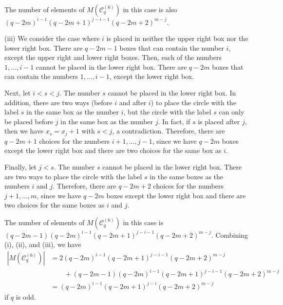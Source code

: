 \documentclass{article}
\theoremstyle{plain}
\theoremstyle{definition}
\theoremstyle{remark}
\numberwithin{equation}{section}
\newcommand{\Cc}{\mathcal{C}}
\begin{document}
The number of elements of $M(\Cc^{(6)}_q)$ in this case is also $(q-2m)^{i-1}(q-2m+1)^{j-i-1}(q-2m+2)^{m-j}$.

(i\hspace{-0.5mm}i\hspace{-0.5mm}i) We consider the case where $i$ is placed in neither the upper right box nor the lower right box. 
There are $q-2m-1$ boxes that can contain the number $i$, except the upper right and lower right boxes.
Then, each of the numbers $1,\dots,i-1$ cannot be placed in the lower right box.
There are $q-2m$ boxes that can contain the numbers $1,\dots,i-1$, except the lower right box.

Next, let $i<s<j$.
The number $s$ cannot be placed in the lower right box.
In addition, there are two ways (before $i$ and after $i$) to place the circle with the label $s$ in the same box as the number $i$, but the circle with the label $s$ can only be placed before $j$ in the same box as the number $j$.
In fact, if $s$ is placed after $j$, then we have $x_s=x_j+1$ with $s<j$, a contradiction.
Therefore, there are $q-2m+1$ choices for the numbers $i+1,\dots,j-1$, since we have $q-2m$ boxes except the lower right box and there are two choices for the same box as $i$.

Finally, let $j<s$.
The number $s$ cannot be placed in the lower right box.
There are two ways to place the circle with the label $s$ in the same boxes as the numbers $i$ and $j$.
Therefore, there are $q-2m+2$ choices for the numbers $j+1,\dots,m$, since we have $q-2m$ boxes except the lower right box and there are two choices for the same boxes as $i$ and $j$.

The number of elements of $M(\Cc^{(6)}_q)$ in this case is $(q-2m-1)(q-2m)^{i-1}(q-2m+1)^{j-i-1}(q-2m+2)^{m-j}$.
Combining (i), (i\hspace{-0.5mm}i), and (i\hspace{-0.5mm}i\hspace{-0.5mm}i), we have 
\begin{align*}
|M(\Cc^{(6)}_q)|
&=2(q-2m)^{i-1}(q-2m+1)^{j-i-1}(q-2m+2)^{m-j}\\
&\qquad+(q-2m-1)(q-2m)^{i-1}(q-2m+1)^{j-i-1}(q-2m+2)^{m-j}\\
&=(q-2m)^{i-1}(q-2m+1)^{j-i}(q-2m+2)^{m-j}
\end{align*}
if $q$ is odd.
\end{document}
